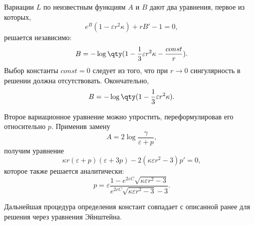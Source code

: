 \documentclass[\docroot/reports/draft/report.tex]{subfiles}
\begin{document}
    Вариации $L$ по неизвестным функциям $A$ и $B$ дают два уравнения, первое из которых,
    \begin{equation*}
        e^B (1 - \varepsilon r^2 \kappa) + r B' - 1 = 0 ,
    \end{equation*}
    решается независимо:
    \begin{equation*}
        B = - \log\qty(1 - \frac{1}{3} \varepsilon r^2 \kappa - \frac{const}{r}) .
    \end{equation*}
    Выбор константы $const = 0$ следует из того, что при $r \to 0$ сингулярность в решении должна отсутствовать. Окончательно,
    \begin{equation*}
        B = - \log\qty(1 - \frac{1}{3} \varepsilon r^2 \kappa) .
    \end{equation*}

    Второе вариационное уравнение можно упростить, переформулировав его относительно $p$. Применив замену
    \begin{equation*}
        A = 2 \log{\frac{\gamma}{\varepsilon + p}} ,
    \end{equation*}
    получим уравнение
    \begin{equation*}
        \kappa r (\varepsilon + p) (\varepsilon + 3 p) - 2 (\kappa \varepsilon r^2 - 3) p' = 0 ,
    \end{equation*}
    которое также решается аналитически:
    \begin{equation*}
        p = \varepsilon \frac{1 - e^{2 \varepsilon C} \sqrt{\kappa \varepsilon r^2 - 3}}{e^{2 \varepsilon C} \sqrt{\kappa \varepsilon r^2 - 3} - 3} .
    \end{equation*}

    Дальнейшая процедура определения констант совпадает с описанной ранее для решения через уравнения Эйнштейна.

\end{document}
